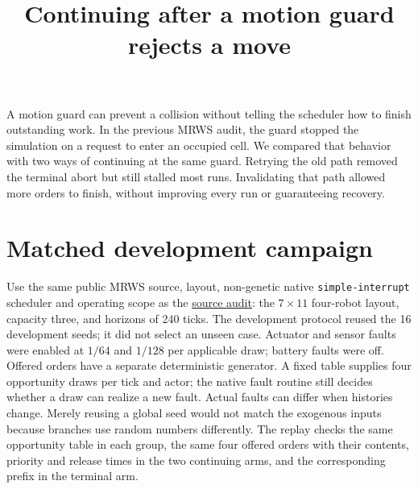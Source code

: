 \documentclass[11pt]{article}
\title{Continuing after a motion guard rejects a move}
\date{}
\begin{document}
\maketitle

A motion guard can prevent a collision without telling the scheduler
how to finish outstanding work. In the previous MRWS audit, the guard
stopped the simulation on a request to enter an occupied cell. We
compared that behavior with two ways of continuing at the same guard.
Retrying the old path removed the terminal abort but still stalled
most runs. Invalidating that path allowed more orders to finish,
without improving every run or guaranteeing recovery.

\section{Matched development campaign}
Use the same public MRWS source, layout, non-genetic native
\texttt{simple-interrupt} scheduler and operating scope as the
\href{https://github.com/eternal-november/eos-research-programmes/pull/401}
{source audit}: the \(7\times11\) four-robot layout, capacity three,
and horizons of 240 ticks. The development protocol reused the
16 development seeds; it did not select an unseen case.
Actuator and sensor faults were enabled at \(1/64\) and \(1/128\)
per applicable draw; battery faults were off. Offered orders have
a separate deterministic generator. A fixed table supplies four
opportunity draws per tick and actor; the native fault routine
still decides whether a draw can realize a new fault. Actual
faults can differ when histories change. Merely reusing a global
seed would not match the exogenous inputs because branches use
random numbers differently. The replay checks the same opportunity
table in each group, the same four offered orders with their
contents, priority and release times in the two continuing arms,
and the corresponding prefix in the terminal arm.
\end{document}
